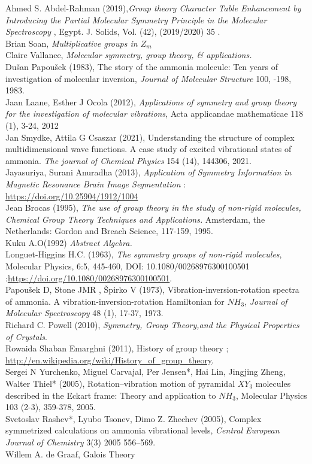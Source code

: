 \documentclass[a4paper, 12pt, openany]{report}
\begin{document}
Ahmed S. Abdel-Rahman (2019),\textit{Group theory  Character  Table  \break Enhancement  by Introducing  the  Partial  Molecular  Symmetry Principle in the  Molecular  Spectroscopy} , Egypt. J.  Solids, Vol.  (42), (2019/2020) 35 .\\[4mm]
Brian Soan, \textit{Multiplicative groups in $Z_m$}\\[4mm]
Claire Vallance,	\textit{Molecular symmetry, group theory, \& applications.}
\\[4mm]
Dušan Papoušek (1983), The story of the ammonia molecule: Ten years of investigation of molecular inversion, \textit{Journal of Molecular Structure} 100, -198, 1983.
\\[4mm]					
Jaan Laane, Esther J Ocola (2012), \textit{Applications of symmetry and group \break theory for the investigation of molecular vibrations}, Acta applicandae \break mathematicae 118 (1), 3-24, 2012\\[4mm]
Jan Smydke, Attila G Csaszar (2021), Understanding the structure of \break complex multidimensional wave functions. A case study of excited \break vibrational states of ammonia. \textit{The journal of Chemical Physics} 154 (14), 144306, 2021.
\\[4mm]Jayasuriya, Surani Anuradha (2013), \textit{Application of Symmetry Information in Magnetic Resonance Brain Image Segmentation}
	: \url{https://doi.org/10.25904/1912/1004}
\\[4mm]
Jean Brocas (1995), \textit{The use of group theory in the study of non-rigid molecules,	Chemical Group Theory Techniques and Applications.} \break Amsterdam, the Netherlands: Gordon and Breach Science, 117-159, 1995.
\\[4mm]
Kuku A.O(1992) \textit{Abstract Algebra.}
\\[4mm]
Longuet-Higgins H.C. (1963), \textit{The symmetry groups of non-rigid molecules}, Molecular Physics, 6:5, 445-460, DOI: 10.1080/00268976300100501
		:\url{https://doi.org/10.1080/00268976300100501}.\\[4mm]
 Papoušek D, Stone JMR , Špirko V (1973),				Vibration-inversion-rotation \break spectra of ammonia. A vibration-inversion-rotation Hamiltonian for $NH_3$, \textit{Journal of Molecular Spectroscopy} 48 (1), 17-37, 1973.
\\[4mm]Richard C. Powell (2010),	\textit{Symmetry, Group Theory,and the Physical \break Properties of Crystals}.
\\[4mm]Rowaida Shaban Emarghni (2011), History of group theory ; \url{http://en.wikipedia.org/wiki/History\_of\_group\_theory}.\\[4mm]
Sergei N Yurchenko, Miguel Carvajal, Per Jensen*, Hai Lin, Jingjing Zheng, Walter Thiel* (2005), Rotation–vibration motion of pyramidal $XY_3$ molecules described in the Eckart frame: Theory and application to $NH_3$, Molecular Physics 103 (2-3), 359-378, 2005.\\[4mm]Svetoslav Rashev*, Lyubo Tsonev, Dimo Z. Zhechev (2005), Complex \break symmetrized calculations on ammonia	vibrational levels, \textit{Central \break European Journal of Chemistry} 3(3) 2005 556–569.\\[4mm]
Willem A. de Graaf, Galois Theory

	
		
\end{document}
